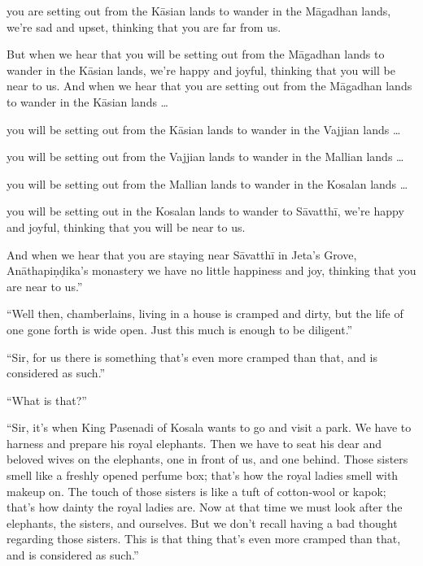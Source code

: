\documentclass[12pt,openany]{book}%
\begin{document}
you are setting out from the \textsanskrit{Kāsian} lands to wander in the \textsanskrit{Māgadhan} lands, we’re sad and upset, thinking that you are far from us. 

But when we hear that you will be setting out from the \textsanskrit{Māgadhan} lands to wander in the \textsanskrit{Kāsian} lands, we’re happy and joyful, thinking that you will be near to us. And when we hear that you are setting out from the \textsanskrit{Māgadhan} lands to wander in the \textsanskrit{Kāsian} lands … 

you will be setting out from the \textsanskrit{Kāsian} lands to wander in the Vajjian lands … 

you will be setting out from the Vajjian lands to wander in the Mallian lands … 

you will be setting out from the Mallian lands to wander in the Kosalan lands … 

you will be setting out in the Kosalan lands to wander to \textsanskrit{Sāvatthī}, we’re happy and joyful, thinking that you will be near to us. 

And when we hear that you are staying near \textsanskrit{Sāvatthī} in Jeta’s Grove, \textsanskrit{Anāthapiṇḍika}’s monastery we have no little happiness and joy, thinking that you are near to us.” 

“Well then, chamberlains, living in a house is cramped and dirty, but the life of one gone forth is wide open. Just this much is enough to be diligent.” 

“Sir, for us there is something that’s even more cramped than that, and is considered as such.” 

“What is that?” 

“Sir, it’s when King Pasenadi of Kosala wants to go and visit a park. We have to harness and prepare his royal elephants. Then we have to seat his dear and beloved wives on the elephants, one in front of us, and one behind. Those sisters smell like a freshly opened perfume box; that’s how the royal ladies smell with makeup on. The touch of those sisters is like a tuft of cotton-wool or kapok; that’s how dainty the royal ladies are. Now at that time we must look after the elephants, the sisters, and ourselves. But we don’t recall having a bad thought regarding those sisters. This is that thing that’s even more cramped than that, and is considered as such.” 
\end{document}

